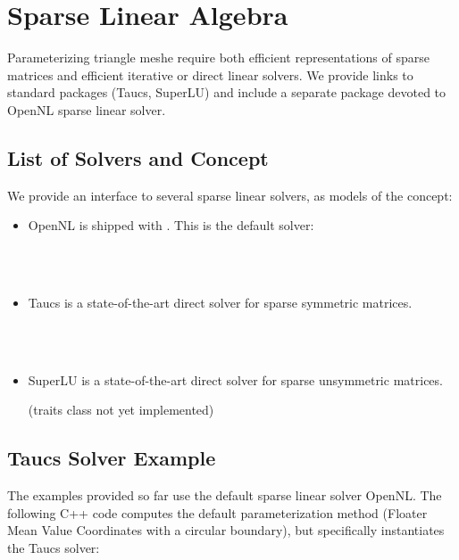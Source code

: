\section{Sparse Linear Algebra}

Parameterizing triangle meshe require both efficient representations
of sparse matrices and efficient iterative or direct linear
solvers. We provide links to standard packages ({\sc Taucs}, SuperLU)
and include a separate package devoted to OpenNL sparse linear solver.

\subsection{List of Solvers and Concept}

We provide an interface to several sparse linear solvers, as models
of the  concept:

\begin{itemize}

\item OpenNL \cite{cgal:l-nmdgp-05} is shipped with \cgal. This is the default solver:

  \\
  \\

\item {\sc Taucs} is a state-of-the-art direct solver for sparse symmetric matrices.

  \\
  \\

\item SuperLU is a state-of-the-art direct solver for sparse unsymmetric matrices.

(traits class not yet implemented)

\end{itemize}


\subsection{{\sc Taucs} Solver Example}

The examples provided so far use the default sparse linear solver
OpenNL. The following C++ code computes the default parameterization
method (Floater Mean Value Coordinates with a circular boundary), but
specifically instantiates the {\sc Taucs} solver:

